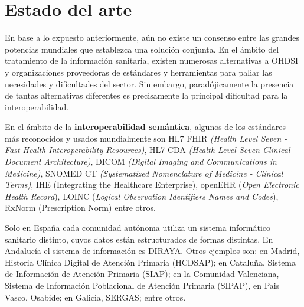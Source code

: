 \section{Estado del arte} \label{sec:01EstadoArte} 



En base a lo expuesto anteriormente, aún no existe un consenso entre las grandes potencias mundiales que establezca una solución conjunta. En el ámbito del tratamiento de la información sanitaria, existen numerosas alternativas a OHDSI y organizaciones proveedoras de estándares y herramientas para paliar las necesidades y dificultades del sector. Sin embargo, paradójicamente la presencia de tantas alternativas diferentes es precisamente la principal dificultad para la interoperabilidad.

En el ámbito de la \textbf{interoperabilidad semántica}, algunos de los estándares más reconocidos y usados mundialmente son HL7 FHIR \textit{(Health Level Seven - Fast Health Interoperability Resources)}, HL7 CDA \textit{(Health Level Seven Clinical Document Architecture)}, DICOM \textit{(Digital Imaging and Communications in Medicine)}, SNOMED CT \textit{(Systematized Nomenclature of Medicine - Clinical Terms)}, IHE (Integrating the Healthcare Enterprise), openEHR (\textit{Open Electronic Health Record}), LOINC (\textit{Logical Observation Identifiers Names and Codes}), RxNorm (Prescription Norm) entre otros.

Solo en España cada comunidad autónoma utiliza un sistema informático sanitario distinto, cuyos datos están estructurados de formas distintas. En Andalucía el sistema de información es DIRAYA. Otros ejemplos son: en Madrid, Historia Clínica Digital de Atención Primaria (HCDSAP); en Cataluña, Sistema de Información de Atención Primaria (SIAP); en la Comunidad Valenciana, Sistema de Información Poblacional de Atención Primaria (SIPAP), en Pais Vasco, Osabide; en Galicia, SERGAS; entre otros.

